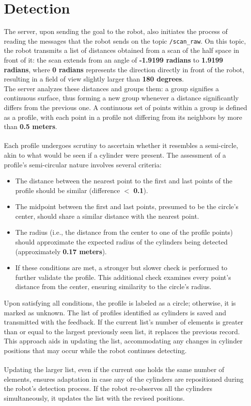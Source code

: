 \section{Detection}
The server, upon sending the goal to the robot, also initiates the process of reading the messages that the robot sends on the topic \texttt{/scan\_raw}.
On this topic, the robot transmits a list of distances obtained from a scan of the half space in front of it: the scan extends from an angle of \textbf{-1.9199 radians} to \textbf{1.9199 radians}, where \textbf{0 radians} represents the direction directly in front of the robot, resulting in a field of view slightly larger than \textbf{180 degrees}.\\

The server analyzes these distances and groups them: a group signifies a continuous surface, thus forming a new group whenever a distance significantly differs from the previous one. A continuous set of points within a group is defined as a profile, with each point in a profile not differing from its neighbors by more than \textbf{0.5 meters}.\\\\

Each profile undergoes scrutiny to ascertain whether it resembles a semi-circle, akin to what would be seen if a cylinder were present. The assessment of a profile's semi-circular nature involves several criteria:
\begin{itemize}
    \item The distance between the nearest point to the first and last points of the profile should be similar (difference $<$ \textbf{0.1}).
    \item The midpoint between the first and last points, presumed to be the circle's center, should share a similar distance with the nearest point.
    \item The radius (i.e., the distance from the center to one of the profile points) should approximate the expected radius of the cylinders being detected (approximately \textbf{0.17 meters}).
    \item If these conditions are met, a stronger but slower check is performed to further validate the profile. This additional check examines every point's distance from the center, ensuring similarity to the circle's radius.
\end{itemize}
Upon satisfying all conditions, the profile is labeled as a circle; otherwise, it is marked as unknown. The list of profiles identified as cylinders is saved and transmitted with the feedback. If the current list's number of elements is greater than or equal to the largest previously seen list, it replaces the previous record. This approach aids in updating the list, accommodating any changes in cylinder positions that may occur while the robot continues detecting.\\\\

Updating the larger list, even if the current one holds the same number of elements, ensures adaptation in case any of the cylinders are repositioned during the robot's detection process. If the robot re-observes all the cylinders simultaneously, it updates the list with the revised positions.\\
